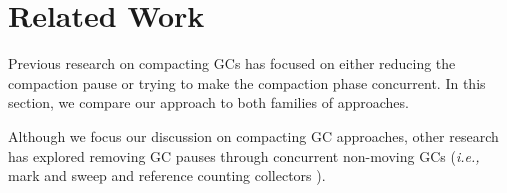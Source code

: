 \documentclass[sigplan,10pt,review,anonymous]{acmart}\settopmatter{printfolios=true,printccs=false,printacmref=false}
\def\OpenSmalltalkVM{OpenSmalltalk-VM\xspace}
\def\ie{\emph{i.e., }}
\begin{document}
%
%

\section{Related Work}
\label{sec:relWork}

Previous research on compacting GCs has focused on either reducing the compaction pause or trying to make the compaction phase concurrent. In this section, we compare our approach to both families of approaches. 

Although we focus our discussion on compacting GC approaches, other research has explored removing GC pauses through concurrent non-moving GCs (\ie mark and sweep and reference counting collectors \cite{ConcNonMovingGC,ConcNonMovingGC2,CMSGC,ConcRefCount}). 
\end{document}
